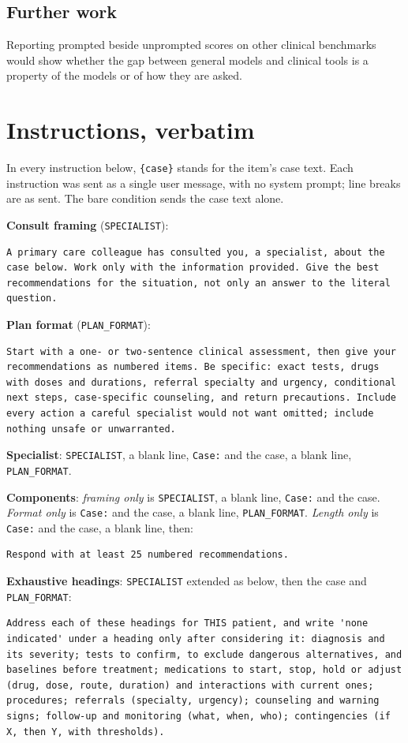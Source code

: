 \documentclass[11pt]{article}
\begin{document}
\subsection{Further work}
\label{supp:further}
Reporting prompted beside unprompted scores on other clinical benchmarks would show whether the gap
between general models and clinical tools is a property of the models or of how they are asked.

\FloatBarrier
\clearpage
\section{Instructions, verbatim}
\label{app:prompts}
In every instruction below, \texttt{\{case\}} stands for the item's case text. Each instruction was
sent as a single user message, with no system prompt; line breaks are as sent. The bare condition
sends the case text alone.

\textbf{Consult framing} (\texttt{SPECIALIST}):
\begin{lstlisting}
A primary care colleague has consulted you, a specialist, about the case below. Work only with the information provided. Give the best recommendations for the situation, not only an answer to the literal question.
\end{lstlisting}

\textbf{Plan format} (\texttt{PLAN\_FORMAT}):
\begin{lstlisting}
Start with a one- or two-sentence clinical assessment, then give your recommendations as numbered items. Be specific: exact tests, drugs with doses and durations, referral specialty and urgency, conditional next steps, case-specific counseling, and return precautions. Include every action a careful specialist would not want omitted; include nothing unsafe or unwarranted.
\end{lstlisting}

\textbf{Specialist}: \texttt{SPECIALIST}, a blank line, \texttt{Case:} and the case, a blank line,
\texttt{PLAN\_FORMAT}.

\textbf{Components}: \emph{framing only} is \texttt{SPECIALIST}, a blank line, \texttt{Case:} and
the case. \emph{Format only} is \texttt{Case:} and the case, a blank line, \texttt{PLAN\_FORMAT}.
\emph{Length only} is \texttt{Case:} and the case, a blank line, then:
\begin{lstlisting}
Respond with at least 25 numbered recommendations.
\end{lstlisting}

\textbf{Exhaustive headings}: \texttt{SPECIALIST} extended as below, then the case and
\texttt{PLAN\_FORMAT}:
\begin{lstlisting}
Address each of these headings for THIS patient, and write 'none indicated' under a heading only after considering it: diagnosis and its severity; tests to confirm, to exclude dangerous alternatives, and baselines before treatment; medications to start, stop, hold or adjust (drug, dose, route, duration) and interactions with current ones; procedures; referrals (specialty, urgency); counseling and warning signs; follow-up and monitoring (what, when, who); contingencies (if X, then Y, with thresholds).
\end{lstlisting}
\end{document}
